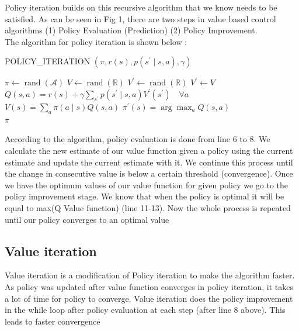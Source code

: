 \documentclass[11pt]{article}
\begin{document}
Policy iteration builds on this recursive algorithm that we know needs to be satisfied. As can be seen in Fig 1, there are two steps in value based control algorithms (1) Policy Evaluation (Prediction) (2) Policy Improvement. \\
The algorithm for policy iteration is shown below : \\

\begin{algorithm}[H]
\caption{POLICY\_ITERATION $\left(\pi, r(s), p\left(s^{\prime} \mid s, a\right), \gamma\right)$}
\label{algo:wma}
\begin{algorithmic}[1]
\STATE $\pi \leftarrow \operatorname{rand}(\mathcal{A})$
\STATE $V \leftarrow \operatorname{rand}(\mathbb{R})$
\STATE $V^{\prime} \leftarrow \operatorname{rand}(\mathbb{R})$
\STATE \qquad $V^{\prime} \leftarrow V$
\STATE $Q(s, a)=r(s)+\gamma \sum_{s^{\prime}} p\left(s^{\prime} \mid s, a\right) V^{\prime}\left(s^{\prime}\right) \quad \forall a $
\STATE $V(s)=\sum_{a} \pi(a \mid s) Q(s, a)$
\ENDFOR
\ENDWHILE
{}
\STATE $\pi^{\prime}(s)=\arg \max _{a} Q(s, a)$
\ENDFOR \\
\IF{$\pi^{\prime}=\pi$}
\STATE {} $\pi$
\ENDIF \\
\end{algorithmic}
\end{algorithm}

According to the algorithm, policy evaluation is done from line 6 to 8. We calculate the new estimate of our value function given a policy using the current estimate and update the current estimate with it. We continue this process until the change in consecutive value is below a certain threshold (convergence). Once we have the optimum values of our value function for given policy we go to the policy improvement stage. We know that when the policy is optimal it will be equal to max(Q Value function) (line 11-13). Now the whole process is repeated until our policy converges to an optimal value

\subsection{Value iteration}
Value iteration is a modification of Policy iteration to make the algorithm faster. As policy was updated after value function converges in policy iteration, it takes a lot of time for policy to converge. Value iteration does the policy improvement in the while loop after policy evaluation at each step (after line 8 above). This leads to faster convergence
\end{document}
